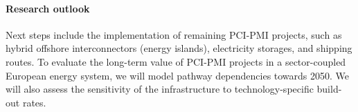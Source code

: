 \documentclass[10pt]{article}
\begin{document}
\paragraph{Research outlook} Next steps include the implementation of remaining PCI-PMI projects, such as hybrid offshore interconnectors (energy islands), electricity storages, and  shipping routes. To evaluate the long-term value of PCI-PMI projects in a sector-coupled European energy system, we will model pathway dependencies towards 2050. We will also assess the sensitivity of the infrastructure to technology-specific build-out rates.




\end{document}
